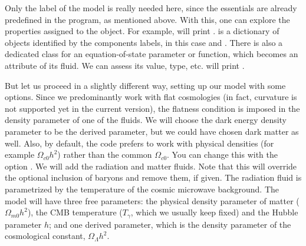 \documentclass[letterpaper,12pt,english]{sphinxhowto}
\begin{document}
%
\begin{sphinxVerbatim}[commandchars=\\\{\}]
     
  
\end{sphinxVerbatim}

Only the label of the model is really needed here, since the essentials
are already predefined in the program, as mentioned above. With this,
one can explore the properties assigned to the object. For example,
 will print .  is a dictionary of
 objects identified by the components labels, in this case
 and . There is also a dedicated class for an
equation-of-state parameter or function, which becomes an attribute of
its fluid. We can assess its value, type, etc.
 will print .

But let us proceed in a slightly different way, setting up our model
with some options. Since we predominantly work with flat cosmologies (in
fact, curvature is not supported yet in the current version), the
flatness condition is imposed in the density parameter of one of the
fluids. We will choose the dark energy density parameter to be the
derived parameter, but we could have chosen dark matter as well. Also,
by default, the code prefers to work with physical densities (for
example \(\Omega_{c0} h^2\)) rather than the common
\(\Omega_{c0}\). You can change this with the option
. We will add the radiation and matter fluids. Note
that this will override the optional inclusion of baryons and remove
them, if given. The radiation fluid is parametrized by the temperature
of the cosmic microwave background. The model will have three free
parameters: the physical density parameter of matter
(\(\Omega_{m0}h^2\)), the CMB temperature (\(T_{\gamma}\), which
we usually keep fixed) and the Hubble parameter \(h\); and one
derived parameter, which is the density parameter of the cosmological
constant, \(\Omega_{\Lambda}h^2\).
\end{document}
